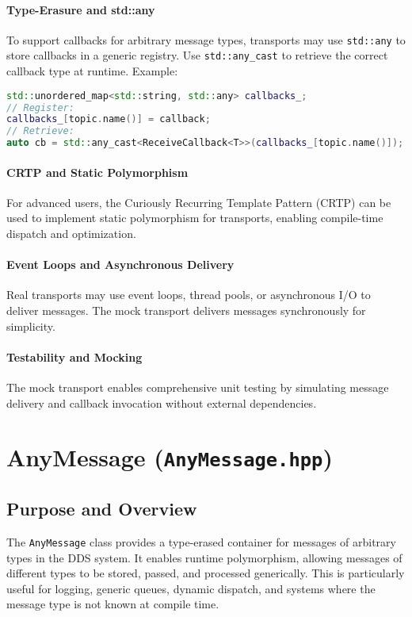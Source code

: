 \documentclass[12pt]{report}
\begin{document}
\paragraph{Type-Erasure and std::any}
To support callbacks for arbitrary message types, transports may use \texttt{std::any} to store callbacks in a generic registry. Use \texttt{std::any\_cast} to retrieve the correct callback type at runtime. Example:
\begin{lstlisting}[language=C++]
std::unordered_map<std::string, std::any> callbacks_;
// Register:
callbacks_[topic.name()] = callback;
// Retrieve:
auto cb = std::any_cast<ReceiveCallback<T>>(callbacks_[topic.name()]);
\end{lstlisting}

\paragraph{CRTP and Static Polymorphism}
For advanced users, the Curiously Recurring Template Pattern (CRTP) can be used to implement static polymorphism for transports, enabling compile-time dispatch and optimization.

\paragraph{Event Loops and Asynchronous Delivery}
Real transports may use event loops, thread pools, or asynchronous I/O to deliver messages. The mock transport delivers messages synchronously for simplicity.

\paragraph{Testability and Mocking}
The mock transport enables comprehensive unit testing by simulating message delivery and callback invocation without external dependencies.

\section{AnyMessage (\texttt{AnyMessage.hpp})}

\subsection{Purpose and Overview}
The \texttt{AnyMessage} class provides a type-erased container for messages of arbitrary types in the DDS system. It enables runtime polymorphism, allowing messages of different types to be stored, passed, and processed generically. This is particularly useful for logging, generic queues, dynamic dispatch, and systems where the message type is not known at compile time.
\end{document}
